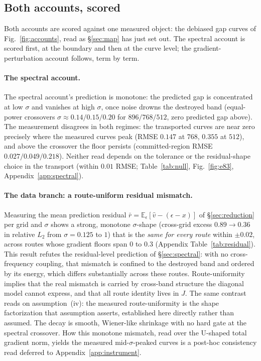 \subsection{Both accounts, scored}
\label{sec:scored}
\label{sec:specscored}
\label{sec:ourscored}

Both accounts are scored against one measured object: the debiased
gap curves of Fig.~\ref{fig:accounts}, read as \S\ref{sec:map} has
just set out. The spectral account is scored first, at the boundary
and then at the curve level; the gradient-perturbation account
follows, term by term.

\paragraph{The spectral account.}
The spectral account's prediction is monotone: the predicted gap is
concentrated at low $\sigma$ and vanishes at high $\sigma$, once
noise drowns the destroyed band (equal-power crossovers
$\sigma \approx 0.14/0.15/0.20$ for $896/768/512$, zero predicted gap
above). The measurement disagrees in both regimes: the transported
curves are near zero precisely where the measured curves peak (RMSE
$0.147$ at $768$, $0.355$ at $512$), and above the crossover the
floor persists (committed-region RMSE $0.027/0.049/0.218$). Neither
read depends on the tolerance or the residual-shape choice in the
transport (within $0.01$ RMSE; Table~\ref{tab:null},
Fig.~\ref{fig:e83}, Appendix~\ref{app:spectral}).


\paragraph{The data branch: a route-uniform residual
mismatch.}
Measuring the mean prediction residual
$\bar r = \mathbb{E}_\epsilon[\hat v - (\epsilon - x)]$ of
\S\ref{sec:reduction} per grid and
$\sigma$ shows a strong,
monotone $\sigma$-shape (cross-grid excess $0.89 \to 0.36$ in
relative $L_2$ from $\sigma{=}0.125$ to $1$) that is the \emph{same
for every route} within $\pm 0.02$, across routes whose gradient
floors span $0$ to $0.3$ (Appendix Table~\ref{tab:residual}). This
result refutes the residual-level prediction of \S\ref{sec:spectral}:
with no cross-frequency coupling, that mismatch is confined to the
destroyed band and ordered by its energy, which differs substantially
across these routes. Route-uniformity implies that the real mismatch
is carried by cross-band structure the diagonal model cannot express,
and that all route identity lives in $J$. The same contrast reads on
assumption~(iv): the measured route-uniformity is the shape
factorization that assumption asserts, established here directly
rather than assumed. The
decay is smooth, Wiener-like shrinkage with no hard gate at the
spectral crossover. How this monotone mismatch, read over the
U-shaped total gradient norm, yields the measured mid-$\sigma$-peaked
curves is a post-hoc consistency read deferred to
Appendix~\ref{app:instrument}.

